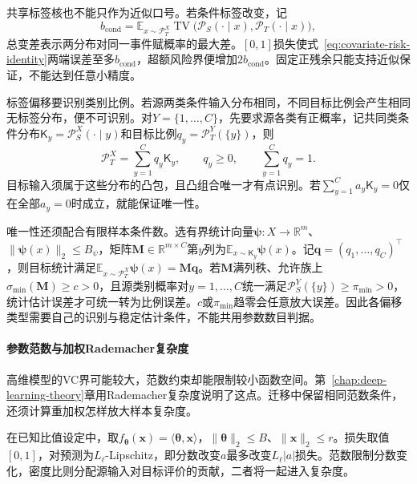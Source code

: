 共享标签核也不能只作为近似口号。若条件标签改变，记
\[
 b_{\mathrm{cond}}=\mathbb E_{x\sim\mathcal P_T^X}
 \operatorname{TV}\bigl(\mathcal P_S(\cdot\mid x),
                        \mathcal P_T(\cdot\mid x)\bigr),
\]
总变差表示两分布对同一事件赋概率的最大差。$[0,1]$损失使式~\eqref{eq:covariate-risk-identity}两端误差至多$b_{\mathrm{cond}}$，超额风险界便增加$2b_{\mathrm{cond}}$。固定正残余只能支持近似保证，不能达到任意小精度。

标签偏移要识别类别比例。若源两类条件输入分布相同，不同目标比例会产生相同无标签分布，便不可识别。对$Y=\{1,\ldots,C\}$，先要求源各类有正概率，记共同类条件分布$\mathsf K_y=\mathcal P_S^X(\cdot\mid y)$和目标比例$q_y=\mathcal P_T^Y(\{y\})$，则
\[
 \mathcal P_T^X=\sum_{y=1}^{C}q_y\mathsf K_y,\qquad
 q_y\geq0,\qquad \sum_{y=1}^{C}q_y=1.
\]
目标输入须属于这些分布的凸包，且凸组合唯一才有点识别。若$\sum_{y=1}^C a_y\mathsf K_y=0$仅在全部$a_y=0$时成立，就能保证唯一性。

唯一性还须配合有限样本条件数。选有界统计向量$\bm\psi:X\to\mathbb R^m$、$\|\bm\psi(x)\|_2\leq B_\psi$，矩阵$\bm M\in\mathbb R^{m\times C}$第$y$列为$\mathbb E_{x\sim\mathsf K_y}\bm\psi(x)$。记$\bm q=(q_1,\ldots,q_C)^\top$，则目标统计满足$\mathbb E_{x\sim\mathcal P_T^X}\bm\psi(x)=\bm M\bm q$。若$\bm M$满列秩、允许族上$\sigma_{\min}(\bm M)\geq c>0$，且源类别概率对$y=1,\ldots,C$统一满足$\mathcal P_S^Y(\{y\})\geq\pi_{\min}>0$，统计估计误差才可统一转为比例误差。$c$或$\pi_{\min}$趋零会任意放大误差。因此各偏移类型需要自己的识别与稳定估计条件，不能共用参数数目判据。

\paragraph{参数范数与加权Rademacher复杂度}
\label{sec:transfer-norm-complexity}

高维模型的VC界可能较大，范数约束却能限制较小函数空间。第~\ref{chap:deep-learning-theory}章用Rademacher复杂度说明了这点。迁移中保留相同范数条件，还须计算重加权怎样放大样本复杂度。

在已知比值设定中，取$f_{\bm\theta}(\bm x)=\langle\bm\theta,\bm x\rangle$，$\|\bm\theta\|_2\leq B$、$\|\bm x\|_2\leq r$。损失取值$[0,1]$，对预测为$L_{\ell}$-Lipschitz，即分数改变$a$最多改变$L_{\ell}|a|$损失。范数限制分数变化，密度比则分配源输入对目标评价的贡献，二者将一起进入复杂度。

